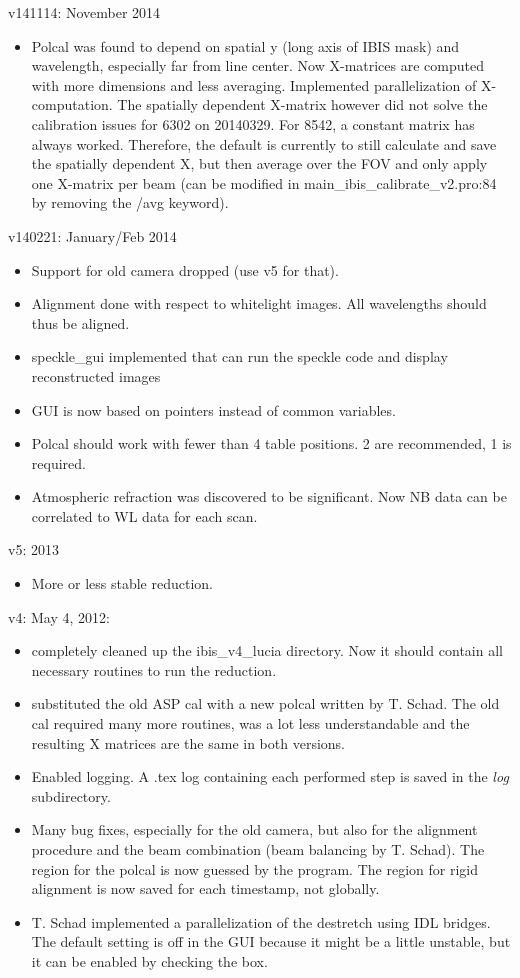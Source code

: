 \documentclass[a4paper,12pt]{article}
\begin{document}
v141114: November 2014
\begin{itemize}
\item Polcal was found to depend on spatial y (long axis of IBIS mask) and wavelength, especially far from line center. Now X-matrices are computed with more dimensions and less averaging. Implemented parallelization of X-computation. The spatially dependent X-matrix however did not solve the calibration issues for 6302 on 20140329. For 8542, a constant matrix has always worked. Therefore, the default is currently to still calculate and save the spatially dependent X, but then average over the FOV and only apply one X-matrix per beam (can be modified in main\_ibis\_calibrate\_v2.pro:84 by removing the /avg keyword).
\end{itemize}


v140221: January/Feb 2014
\begin{itemize}
\item Support for old camera dropped (use v5 for that).
\item Alignment done with respect to whitelight images. All wavelengths should thus be aligned.
\item speckle\_gui implemented that can run the speckle code and display reconstructed images
\item GUI is now based on pointers instead of common variables.
\item Polcal should work with fewer than 4 table positions. 2 are
  recommended, 1 is required.
\item Atmospheric refraction was discovered to be significant. Now NB data can be correlated to WL data for each scan.
\end{itemize}



v5: 2013
\begin{itemize}
\item More or less stable reduction.
\end{itemize}



v4: May 4, 2012:
\begin{itemize}
\item completely cleaned up the ibis\_v4\_lucia directory. Now it should contain all necessary routines to run the reduction.
\item substituted the old ASP cal with a new polcal written by T. Schad. The old cal required many more routines, was a lot less understandable and the resulting X matrices are the same in both versions.
\item Enabled logging. A .tex log containing  each performed step is saved in the \textit{log} subdirectory.
\item Many bug fixes, especially for the old camera, but also for the alignment procedure and the beam combination (beam balancing by T. Schad). The region for the polcal is now guessed by the program. The region for rigid alignment is now saved for each timestamp, not globally.
\item T. Schad implemented a parallelization of the destretch using IDL bridges. The default setting is off in the GUI because it might be a little unstable, but it can be enabled by checking the box.
\end{itemize}
\end{document}
